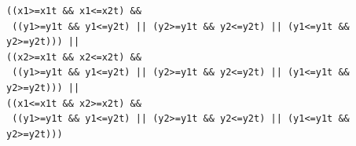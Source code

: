 \begin{verbatim}
((x1>=x1t && x1<=x2t) &&
 ((y1>=y1t && y1<=y2t) || (y2>=y1t && y2<=y2t) || (y1<=y1t && y2>=y2t))) ||
((x2>=x1t && x2<=x2t) &&
 ((y1>=y1t && y1<=y2t) || (y2>=y1t && y2<=y2t) || (y1<=y1t && y2>=y2t))) ||
((x1<=x1t && x2>=x2t) &&
 ((y1>=y1t && y1<=y2t) || (y2>=y1t && y2<=y2t) || (y1<=y1t && y2>=y2t)))
\end{verbatim}

